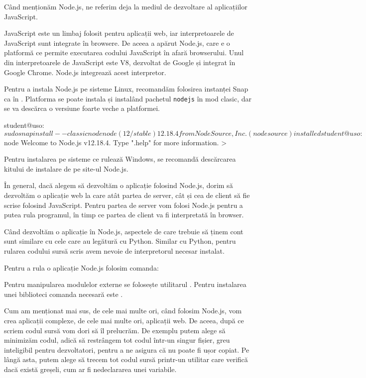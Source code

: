 Când menționăm Node.js, ne referim deja la mediul de dezvoltare al aplicațiilor
JavaScript.

JavaScript este un limbaj folosit pentru aplicații web, iar interpretoarele de
JavaScript sunt integrate în browsere. De aceea a apărut Node.js, care e o
platformă ce permite executarea codului JavaScript în afară browserului. Unul
din interpretoarele de JavaScript este V8, dezvoltat de Google și integrat în
Google Chrome. Node.js integrează acest interpretor.

Pentru a instala Node.js pe sisteme Linux, recomandăm folosirea instanței Snap ca în .
Platforma se poate instala și instalând pachetul \texttt{nodejs} în mod clasic, dar se va descărca o versiune foarte veche a platformei.

\begin{screen}[caption={Instalare Node.js},label={lst:appdev:install-nodejs}]
student@uso:~$ sudo snap install --classic node
node (12/stable) 12.18.4 from NodeSource, Inc. (nodesource) installed

student@uso:~$ node
Welcome to Node.js v12.18.4.
Type ".help" for more information.
>
\end{screen}

Pentru instalarea pe sisteme ce rulează Windows, se recomandă descărcarea
kitului de instalare de pe site-ul Node.js.

În general, dacă alegem să dezvoltăm o aplicație folosind Node.js, dorim să
dezvoltăm o aplicație web la care atât partea de server, cât și cea de client să
fie scrise folosind JavaScript. Pentru partea de server vom folosi Node.js
pentru a putea rula programul, în timp ce partea de client va fi interpretată în
browser.

Când dezvoltăm o aplicație în Node.js, aspectele de care trebuie să ținem cont
sunt similare cu cele care au legătură cu Python. Similar cu Python, pentru
rularea codului sursă scris avem nevoie de interpretorul necesar instalat.

Pentru a rula o aplicație Node.js folosim comanda:


Pentru manipularea modulelor externe se folosește utilitarul . Pentru
instalarea unei biblioteci comanda necesară este .

Cum am menționat mai sus, de cele mai multe ori, când folosim Node.js, vom crea
aplicații complexe, de cele mai multe ori, aplicații web. De aceea, după ce
scriem codul sursă vom dori să îl prelucrăm. De exemplu putem alege să minimizăm
codul, adică să restrângem tot codul într-un singur fișier, greu inteligibil
pentru dezvoltatori, pentru a ne asigura că nu poate fi ușor copiat. Pe lângă
asta, putem alege să trecem tot codul sursă printr-un utilitar care verifică
dacă există greșeli, cum ar fi nedeclararea unei variabile.


